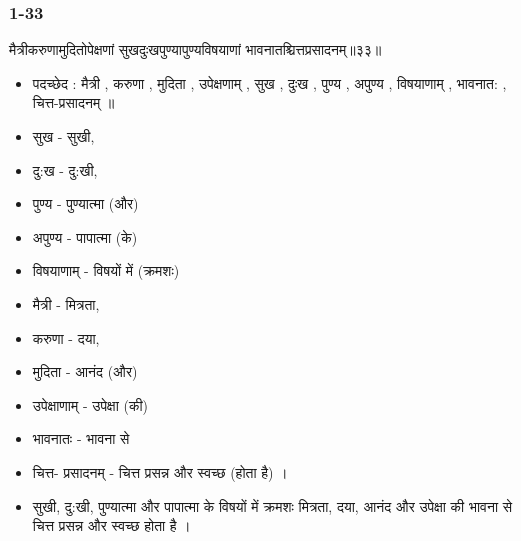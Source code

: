 \begin{frame}[fragile]\frametitle{1-33}
\begin{sanskrit}
मैत्रीकरुणामुदितोपेक्षणां सुखदुःखपुण्यापुण्यविषयाणां भावनातश्चित्तप्रसादनम्॥३३॥
\end{sanskrit}

	\begin{itemize}
	\item पदच्छेद : मैत्री , करुणा , मुदिता , उपेक्षणाम् , सुख , दुःख , पुण्य , अपुण्य , विषयाणाम् , भावनात: , चित्त-प्रसादनम् ॥
	\item सुख - सुखी,
	\item दु:ख - दु:खी,
	\item पुण्य - पुण्यात्मा (और)
	\item अपुण्य - पापात्मा (के)
	\item विषयाणाम् - विषयों में (क्रमशः)
	\item मैत्री - मित्रता,
	\item करुणा - दया,
	\item मुदिता - आनंद (और)
	\item उपेक्षाणाम् - उपेक्षा (की)
	\item भावनातः - भावना से
	\item चित्त- प्रसादनम् - चित्त प्रसन्न और स्वच्छ (होता है) ।
	\item सुखी, दु:खी, पुण्यात्मा और पापात्मा के विषयों में क्रमशः मित्रता, दया, आनंद और उपेक्षा की भावना से चित्त प्रसन्न और स्वच्छ होता है ।
	\end{itemize}	
\end{frame}

